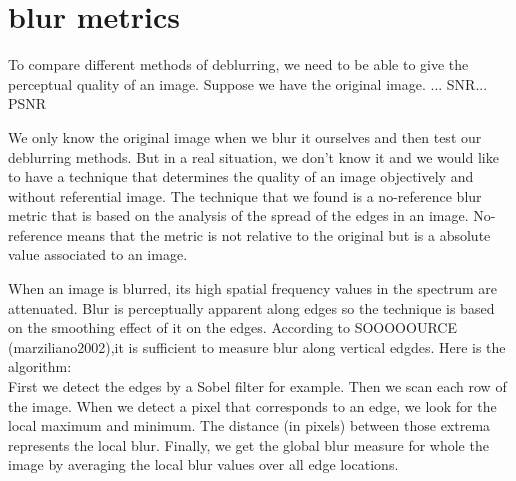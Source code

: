 \section{blur metrics}

To compare different methods of deblurring, we need to be able to give the perceptual quality of an image. Suppose we have the original image. ... SNR... PSNR

We only know the original image when we blur it ourselves and then test our deblurring methods. But in a real situation, we don't know it and we would like to have a technique that determines the quality of an image objectively and without referential image. The technique that we found is a no-reference blur metric that is based on the analysis of the spread of the edges in an image. No-reference means that the metric is not relative to the original but is a absolute value associated to an image.

When an image is blurred, its high spatial frequency values in the spectrum are attenuated. Blur is perceptually apparent along edges so the technique is based on the smoothing effect of it on the edges. According to SOOOOOURCE (marziliano2002),it is sufficient to measure blur along vertical edgdes. Here is the algorithm:\\
First we detect the edges by a Sobel filter for example. Then we scan each row of the image. When we detect a pixel that corresponds to an edge, we look for the local maximum and minimum. The distance (in pixels) between those extrema represents the local blur. Finally, we get the global blur measure for whole the image by averaging the local blur values over all edge locations.

